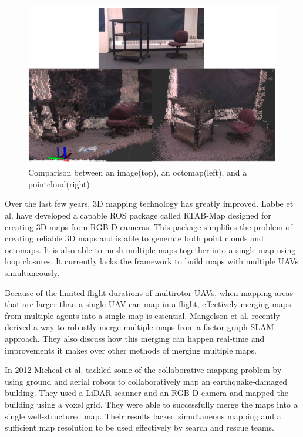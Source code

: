\documentclass[12pt, letterpaper]{article}
\begin{document}
\begin{figure}[h] %
	\centering
	\includegraphics[trim = 0mm 0mm 0mm 0mm,clip,width=6.5in]{voxel.png}
	\caption{Comparison between an image(top), an octomap(left), and a pointcloud(right)}
	\label{fig:voxel}
\end{figure}

Over the last few years, 3D mapping technology has greatly improved. Labbe et al. \cite{Labbe2011a} \cite{Labbe2013} have developed a capable ROS package called RTAB-Map designed for creating 3D maps from RGB-D cameras. This package simplifies the problem of creating reliable 3D maps and is able to generate both point clouds and octomaps. It is also able to mesh multiple maps together into a single map using loop closures. It currently lacks the framework to build maps with multiple UAVs simultaneously.

Because of the limited flight durations of multirotor UAVs, when mapping areas that are larger than a single UAV can map in a flight, effectively merging maps from multiple agents into a single map is essential. Mangelson et al. \cite{Mangelson2018} recently derived a way to robustly merge multiple maps from a factor graph SLAM approach. They also discuss how this merging can happen real-time and improvements it makes over other methods of merging multiple maps.

In 2012 Micheal et al. \cite{Michael2012} tackled some of the collaborative mapping problem by using ground and aerial robots to collaboratively map an earthquake-damaged building. They used a LiDAR scanner and an RGB-D camera and mapped the building using a voxel grid. They were able to successfully merge the maps into a single well-structured map. Their results lacked simultaneous mapping and a sufficient map resolution to be used effectively by search and rescue teams.   
\end{document}

